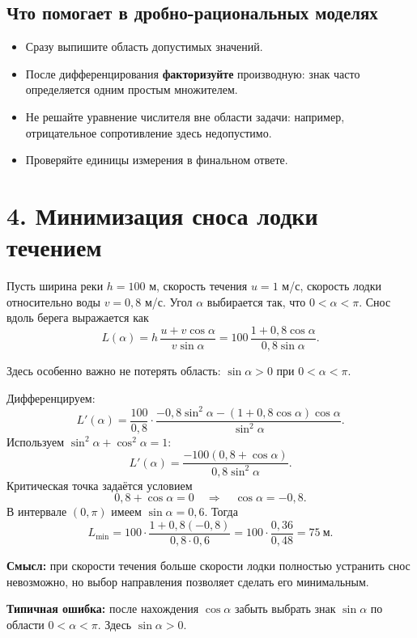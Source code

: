 \documentclass[a4paper,12pt]{article}
\newcommand{\key}[1]{\textcolor{darkaccent}{\textbf{#1}}}
\newcommand{\important}[1]{\textcolor{warn}{\textbf{#1}}}
\begin{document}
\subsection*{Что помогает в дробно-рациональных моделях}
\begin{itemize}
  \item Сразу выпишите область допустимых значений.
  \item После дифференцирования \key{факторизуйте} производную: знак часто определяется одним простым множителем.
  \item Не решайте уравнение числителя вне области задачи: например, отрицательное сопротивление здесь недопустимо.
  \item Проверяйте единицы измерения в финальном ответе.
\end{itemize}

\clearpage

\section*{4. Минимизация сноса лодки течением}

Пусть ширина реки \(h=100\) м, скорость течения \(u=1\) м/с, скорость лодки относительно воды \(v=0{,}8\) м/с. Угол \(\alpha\) выбирается так, что \(0<\alpha<\pi\). Снос вдоль берега выражается как
\[
L(\alpha)=h\,\frac{u+v\cos\alpha}{v\sin\alpha}
=100\,\frac{1+0{,}8\cos\alpha}{0{,}8\sin\alpha}.
\]

Здесь особенно важно не потерять область: \(\sin\alpha>0\) при \(0<\alpha<\pi\).

Дифференцируем:
\[
L'(\alpha)=\frac{100}{0{,}8}\cdot
\frac{-0{,}8\sin^2\alpha-(1+0{,}8\cos\alpha)\cos\alpha}{\sin^2\alpha}.
\]
Используем \(\sin^2\alpha+\cos^2\alpha=1\):
\[
L'(\alpha)=\frac{-100(0{,}8+\cos\alpha)}{0{,}8\sin^2\alpha}.
\]
Критическая точка задаётся условием
\[
0{,}8+\cos\alpha=0
\quad\Longrightarrow\quad
\boxed{\cos\alpha=-0{,}8}.
\]
В интервале \((0,\pi)\) имеем \(\sin\alpha=0{,}6\). Тогда
\[
L_{\min}=100\cdot\frac{1+0{,}8(-0{,}8)}{0{,}8\cdot0{,}6}
=100\cdot\frac{0{,}36}{0{,}48}
=\boxed{75\ \text{м}}.
\]

\key{Смысл:} при скорости течения больше скорости лодки полностью устранить снос невозможно, но выбор направления позволяет сделать его минимальным.

\important{Типичная ошибка:} после нахождения \(\cos\alpha\) забыть выбрать знак \(\sin\alpha\) по области \(0<\alpha<\pi\). Здесь \(\sin\alpha>0\).
\end{document}
